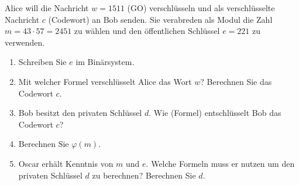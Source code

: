 \begin{aufgabe}
Alice will die Nachricht $w = 1511$ (GO) verschlüsseln und als verschlüsselte Nachricht $c$ (Codewort) an Bob senden. Sie verabreden als Modul die Zahl $m = 43 \cdot 57 = 2451$ zu wählen und den öffentlichen Schlüssel $e = 221$ zu verwenden.
\begin{enumerate}[label=\alph*)]
  \item Schreiben Sie $e$ im Binärsystem.
  \item Mit welcher Formel verschlüsselt Alice das Wort $w$? Berechnen Sie das Codewort $c$.
  \item Bob besitzt den privaten Schlüssel $d$. Wie (Formel) entschlüsselt Bob das Codewort $c$?
  \item Berechnen Sie $\varphi(m)$.
  \item Oscar erhält Kenntnis von $m$ und $e$. Welche Formeln muss er nutzen um den privaten Schlüssel $d$ zu berechnen? Berechnen Sie $d$.
\end{enumerate}
\end{aufgabe}
